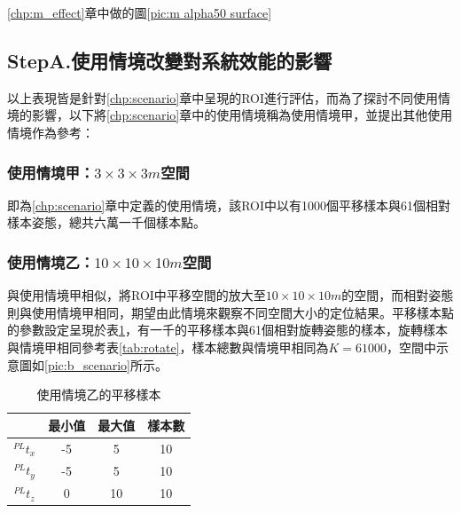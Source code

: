 \ref{chp:m_effect}章中做的圖\ref{pic:m alpha50 surface}





\subsection{StepA.使用情境改變對系統效能的影響}
以上表現皆是針對\ref{chp:scenario}章中呈現的ROI進行評估，而為了探討不同使用情境的影響，以下將\ref{chp:scenario}章中的使用情境稱為使用情境甲，並提出其他使用情境作為參考：

\subsubsection{使用情境甲：$3\times 3\times 3m$空間}

即為\ref{chp:scenario}章中定義的使用情境，該ROI中以有1000個平移樣本與61個相對樣本姿態，總共六萬一千個樣本點。

\subsubsection{使用情境乙：$10\times 10\times 10m$空間}

與使用情境甲相似，將ROI中平移空間的放大至$10\times 10\times 10m$的空間，而相對姿態則與使用情境甲相同，期望由此情境來觀察不同空間大小的定位結果。平移樣本點的參數設定呈現於表\ref{tab:B_translate}，有一千的平移樣本與61個相對旋轉姿態的樣本，旋轉樣本與情境甲相同參考表\ref{tab:rotate}，樣本總數與情境甲相同為$K=61000$，空間中示意圖如\ref{pic:b_scenario}所示。

\begin{table}[htpb]
    \begin{center}
      \caption{使用情境乙的平移樣本}
      \label{tab:B_translate}
      \begin{tabular}{c|c|c|c} %
         & \textbf{最小值} & \textbf{最大值}&\textbf{樣本數}\\
        \hline
        $^{PL}t_x$ & -5 & 5&10\\
        $^{PL}t_y$ & -5 & 5&10\\
        $^{PL}t_z$ & 0 & 10 &10\\
      \end{tabular}
    \end{center}
  \end{table}


